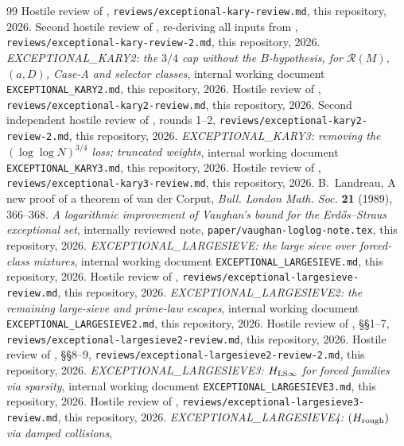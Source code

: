 \documentclass[10pt,reqno]{amsart}
\theoremstyle{definition}
\theoremstyle{remark}
\newcommand{\cR}{\mathscr R}
\begin{document}
\begin{thebibliography}{99}
Hostile review of \cite{KA}, \texttt{reviews/exceptional-kary-review.md},
this repository, 2026.
Second hostile review of \cite{KA}, re-deriving all inputs from \cite{TW},
\texttt{reviews/exceptional-kary-review-2.md}, this repository, 2026.
\emph{EXCEPTIONAL\_KARY2: the $3/4$ cap without the $B$-hypothesis, for
$\cR(M)$, $(a,D)$, Case-A and selector classes}, internal working document
\texttt{EXCEPTIONAL\_KARY2.md}, this repository, 2026.
Hostile review of \cite{KA2}, \texttt{reviews/exceptional-kary2-review.md},
this repository, 2026.
Second independent hostile review of \cite{KA2}, rounds 1--2,
\texttt{reviews/exceptional-kary2-review-2.md}, this repository, 2026.
\emph{EXCEPTIONAL\_KARY3: removing the $(\log\log N)^{3/4}$ loss; truncated
weights}, internal working document \texttt{EXCEPTIONAL\_KARY3.md}, this
repository, 2026.
Hostile review of \cite{KA3}, \texttt{reviews/exceptional-kary3-review.md},
this repository, 2026.
B.~Landreau, A new proof of a theorem of van der Corput,
\emph{Bull. London Math. Soc.} \textbf{21} (1989), 366--368.
\emph{A logarithmic improvement of Vaughan's bound for the
Erd\H{o}s--Straus exceptional set}, internally reviewed note,
\texttt{paper/vaughan-loglog-note.tex}, this repository, 2026.
\emph{EXCEPTIONAL\_LARGESIEVE: the large sieve over forced-class
mixtures}, internal working document \texttt{EXCEPTIONAL\_LARGESIEVE.md},
this repository, 2026.
Hostile review of \cite{LS}, \texttt{reviews/exceptional-largesieve-review.md},
this repository, 2026.
\emph{EXCEPTIONAL\_LARGESIEVE2: the remaining large-sieve and prime-law
escapes}, internal working document \texttt{EXCEPTIONAL\_LARGESIEVE2.md},
this repository, 2026.
Hostile review of \cite{LS2}, \S\S1--7,
\texttt{reviews/exceptional-largesieve2-review.md}, this repository, 2026.
Hostile review of \cite{LS2}, \S\S8--9,
\texttt{reviews/exceptional-largesieve2-review-2.md}, this repository, 2026.
\emph{EXCEPTIONAL\_LARGESIEVE3: $H_{{\rm LS}\infty}$ for forced families via
sparsity}, internal working document \texttt{EXCEPTIONAL\_LARGESIEVE3.md},
this repository, 2026.
Hostile review of \cite{LS3}, \texttt{reviews/exceptional-largesieve3-review.md},
this repository, 2026.
\emph{EXCEPTIONAL\_LARGESIEVE4: $(H_{\rm rough})$ via damped collisions},

\end{thebibliography}
\end{document}
